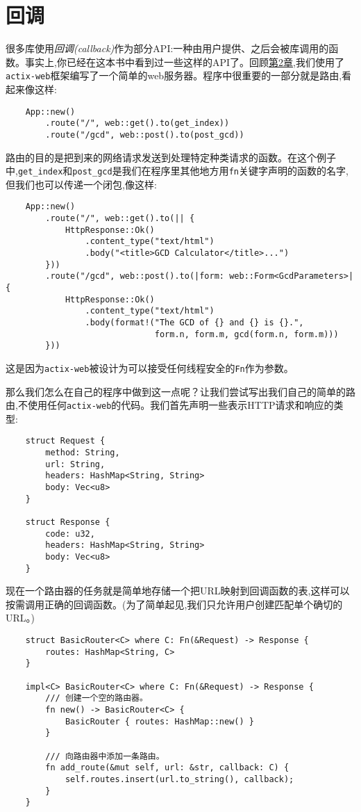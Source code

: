 \section{回调}\label{callback}

很多库使用\emph{回调(callback)}作为部分API:一种由用户提供、之后会被库调用的函数。事实上,你已经在这本书中看到过一些这样的API了。回顾\hyperref[ch02]{第2章},我们使用了\texttt{actix-web}框架编写了一个简单的web服务器。程序中很重要的一部分就是路由,看起来像这样:
\begin{verbatim}
    App::new()
        .route("/", web::get().to(get_index))
        .route("/gcd", web::post().to(post_gcd))
\end{verbatim}

路由的目的是把到来的网络请求发送到处理特定种类请求的函数。在这个例子中,\texttt{get\_index}和\texttt{post\_gcd}是我们在程序里其他地方用\texttt{fn}关键字声明的函数的名字,但我们也可以传递一个闭包,像这样:
\begin{verbatim}
    App::new()
        .route("/", web::get().to(|| {
            HttpResponse::Ok()
                .content_type("text/html")
                .body("<title>GCD Calculator</title>...")
        }))
        .route("/gcd", web::post().to(|form: web::Form<GcdParameters>| {
            HttpResponse::Ok()
                .content_type("text/html")
                .body(format!("The GCD of {} and {} is {}.",
                              form.n, form.m, gcd(form.n, form.m)))
        }))
\end{verbatim}

这是因为\texttt{actix-web}被设计为可以接受任何线程安全的\texttt{Fn}作为参数。

那么我们怎么在自己的程序中做到这一点呢？让我们尝试写出我们自己的简单的路由,不使用任何\texttt{actix-web}的代码。我们首先声明一些表示HTTP请求和响应的类型:
\begin{verbatim}
    struct Request {
        method: String,
        url: String,
        headers: HashMap<String, String>
        body: Vec<u8>
    }

    struct Response {
        code: u32,
        headers: HashMap<String, String>
        body: Vec<u8>
    }
\end{verbatim}

现在一个路由器的任务就是简单地存储一个把URL映射到回调函数的表,这样可以按需调用正确的回调函数。(为了简单起见,我们只允许用户创建匹配单个确切的URL。)

\begin{verbatim}
    struct BasicRouter<C> where C: Fn(&Request) -> Response {
        routes: HashMap<String, C>
    }

    impl<C> BasicRouter<C> where C: Fn(&Request) -> Response {
        /// 创建一个空的路由器。
        fn new() -> BasicRouter<C> {
            BasicRouter { routes: HashMap::new() }
        }

        /// 向路由器中添加一条路由。
        fn add_route(&mut self, url: &str, callback: C) {
            self.routes.insert(url.to_string(), callback);
        }
    }
\end{verbatim}

